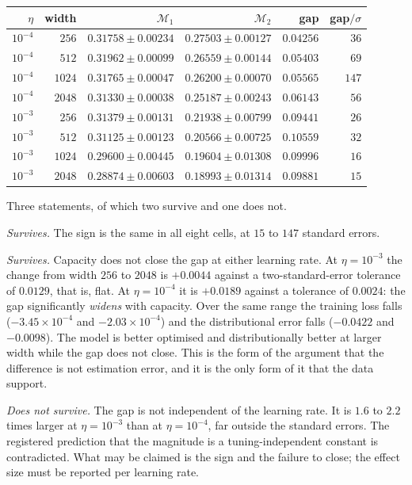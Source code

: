 \documentclass[11pt]{article}
\begin{document}
\begin{center}
\begin{tabular}{@{}rrrrrr@{}}
\toprule
$\eta$ & width & $\mathcal M_1$ & $\mathcal M_2$ & gap & gap$/\sigma$\\
\midrule
$10^{-4}$ & $256$ & $0.31758\pm0.00234$ & $0.27503\pm0.00127$ & $0.04256$ & $36$\\
$10^{-4}$ & $512$ & $0.31962\pm0.00099$ & $0.26559\pm0.00144$ & $0.05403$ & $69$\\
$10^{-4}$ & $1024$ & $0.31765\pm0.00047$ & $0.26200\pm0.00070$ & $0.05565$ & $147$\\
$10^{-4}$ & $2048$ & $0.31330\pm0.00038$ & $0.25187\pm0.00243$ & $0.06143$ & $56$\\
\midrule
$10^{-3}$ & $256$ & $0.31379\pm0.00131$ & $0.21938\pm0.00799$ & $0.09441$ & $26$\\
$10^{-3}$ & $512$ & $0.31125\pm0.00123$ & $0.20566\pm0.00725$ & $0.10559$ & $32$\\
$10^{-3}$ & $1024$ & $0.29600\pm0.00445$ & $0.19604\pm0.01308$ & $0.09996$ & $16$\\
$10^{-3}$ & $2048$ & $0.28874\pm0.00603$ & $0.18993\pm0.01314$ & $0.09881$ & $15$\\
\bottomrule
\end{tabular}
\end{center}

Three statements, of which two survive and one does not.

\emph{Survives.} The sign is the same in all eight cells, at $15$ to $147$ standard errors.

\emph{Survives.} Capacity does not close the gap at either learning rate. At $\eta=10^{-3}$ the
change from width $256$ to $2048$ is $+0.0044$ against a two-standard-error tolerance of $0.0129$,
that is, flat. At $\eta=10^{-4}$ it is $+0.0189$ against a tolerance of $0.0024$: the gap
significantly \emph{widens} with capacity. Over the same range the training loss falls
($-3.45\times10^{-4}$ and $-2.03\times10^{-4}$) and the distributional error falls ($-0.0422$ and
$-0.0098$). The model is better optimised and distributionally better at larger width while the
gap does not close. This is the form of the argument that the difference is not estimation error,
and it is the only form of it that the data support.

\emph{Does not survive.} The gap is not independent of the learning rate. It is $1.6$ to $2.2$
times larger at $\eta=10^{-3}$ than at $\eta=10^{-4}$, far outside the standard errors. The
registered prediction that the magnitude is a tuning-independent constant is contradicted. What
may be claimed is the sign and the failure to close; the effect size must be reported per
learning rate.
\end{document}
